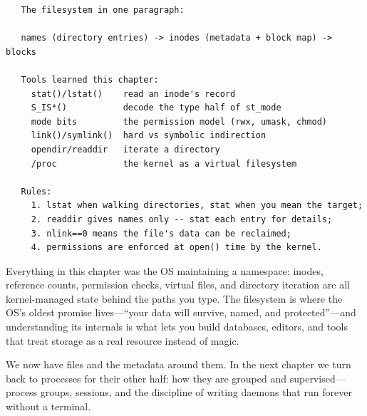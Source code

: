 \begin{verbatim}
   The filesystem in one paragraph:

   names (directory entries) -> inodes (metadata + block map) -> blocks

   Tools learned this chapter:
     stat()/lstat()    read an inode's record
     S_IS*()           decode the type half of st_mode
     mode bits         the permission model (rwx, umask, chmod)
     link()/symlink()  hard vs symbolic indirection
     opendir/readdir   iterate a directory
     /proc             the kernel as a virtual filesystem

   Rules:
     1. lstat when walking directories, stat when you mean the target;
     2. readdir gives names only -- stat each entry for details;
     3. nlink==0 means the file's data can be reclaimed;
     4. permissions are enforced at open() time by the kernel.
\end{verbatim}

\begin{osconcept}
Everything in this chapter was the OS maintaining a namespace: inodes,
reference counts, permission checks, virtual files, and directory
iteration are all kernel-managed state behind the paths you type. The
filesystem is where the OS's oldest promise lives---``your data will
survive, named, and protected''---and understanding its internals is
what lets you build databases, editors, and tools that treat storage
as a real resource instead of magic.
\end{osconcept}

We now have files and the metadata around them. In the next chapter we
turn back to processes for their other half: how they are grouped and
supervised---process groups, sessions, and the discipline of writing
daemons that run forever without a terminal.

